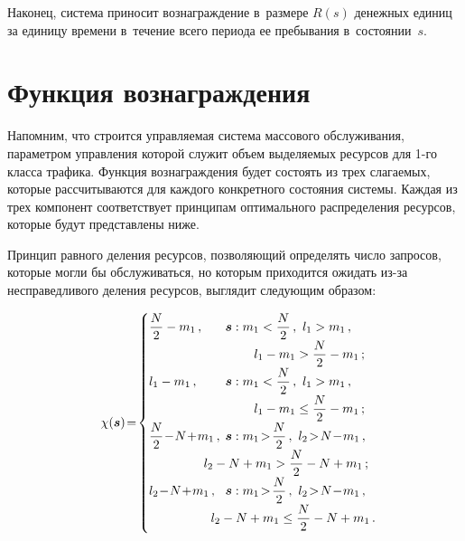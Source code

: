 \begin{multicols}{2}
  \vspace*{-4pt}
  
  Наконец, система приносит вознаграждение в~размере $R(s)$ денежных единиц за 
единицу времени в~течение всего периода ее пребывания в~состоянии~$s$. 

\vspace*{-12pt}
  
  \section{Функция вознаграждения}
  
  \vspace*{-4pt}
  
  Напомним, что строится управляемая система массового обслуживания, 
параметром управления которой служит объем выделяемых ресурсов для \mbox{1-го} 
класса трафика. Функция вознаграждения будет состоять из трех слагаемых, 
которые рассчитываются для каждого конкретного состояния системы. Каждая 
из трех компонент соответствует принципам оптимального распределения 
ресурсов, которые будут представлены ниже.
  
  Принцип равного деления ресурсов, позволяющий определять число 
запросов, которые могли бы обслуживаться, но которым приходится ожидать 
из-за несправедливого деления ресурсов, выглядит следующим образом:

\vspace*{-4pt}

  \begin{equation*}
  \chi(\bm{s})\!=\! \begin{cases}
  \fr{N}{2}-m_1\,, & \hspace*{-2mm} \bm{s}: m_1<\fr{N}{2}\,,\ l_1>m_1\,,\\[-2pt]
  & \hspace*{6mm}l_1-m_1> \fr{N}{2}- m_1\,;\\[-2pt]
  l_1-m_1\,, &\hspace*{-2mm} \bm{s}: m_1<\fr{N}{2}\,,\ l_1>m_1\,,\\[-2pt]
  & \hspace*{6mm}l_1-m_1\leq \fr{N}{2}-m_1\,;\\[-2pt]
  \fr{N}{2}\!-\!N\!+\!m_1\,, & \hspace*{-2mm}\bm{s}: m_1\!>\!\fr{N}{2}\,,\ l_2\!>\!N\!-\!m_1\,,\\[-2pt]
  & \hspace*{-8mm}l_2-N+m_1> \fr{N}{2}-N+m_1\,;\\[-2pt]
  l_2\!-\!N\!+\!m_1\,, &\hspace*{-2mm} \bm{s}: m_1\!>\!\fr{N}{2}\,,\ l_2\!>\!N\!-\!m_1\,,\\[-2pt]
 & \hspace*{-6mm}l_2-N+m_1\leq \fr{N}{2}-N+m_1\,.
\!  \end{cases}\!\!\!
  \end{equation*}
  

\end{multicols}
